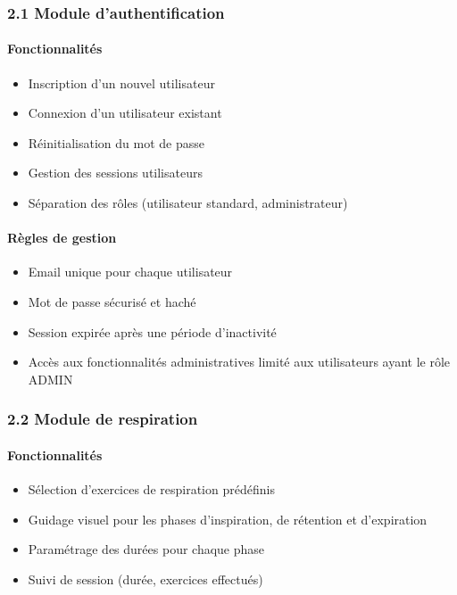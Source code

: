 \documentclass[
]{article}
\providecommand{\tightlist}{%
  \setlength{\itemsep}{0pt}\setlength{\parskip}{0pt}}
\begin{document}
\subsubsection{2.1 Module
d’authentification}\label{module-dauthentification}

\paragraph{Fonctionnalités}\label{fonctionnalituxe9s}

\begin{itemize}
\tightlist
\item
  Inscription d’un nouvel utilisateur
\item
  Connexion d’un utilisateur existant
\item
  Réinitialisation du mot de passe
\item
  Gestion des sessions utilisateurs
\item
  Séparation des rôles (utilisateur standard, administrateur)
\end{itemize}

\paragraph{Règles de gestion}\label{ruxe8gles-de-gestion}

\begin{itemize}
\tightlist
\item
  Email unique pour chaque utilisateur
\item
  Mot de passe sécurisé et haché
\item
  Session expirée après une période d’inactivité
\item
  Accès aux fonctionnalités administratives limité aux utilisateurs
  ayant le rôle ADMIN
\end{itemize}

\subsubsection{2.2 Module de respiration}\label{module-de-respiration}

\paragraph{Fonctionnalités}\label{fonctionnalituxe9s-1}

\begin{itemize}
\tightlist
\item
  Sélection d’exercices de respiration prédéfinis
\item
  Guidage visuel pour les phases d’inspiration, de rétention et
  d’expiration
\item
  Paramétrage des durées pour chaque phase
\item
  Suivi de session (durée, exercices effectués)
\end{itemize}
\end{document}
